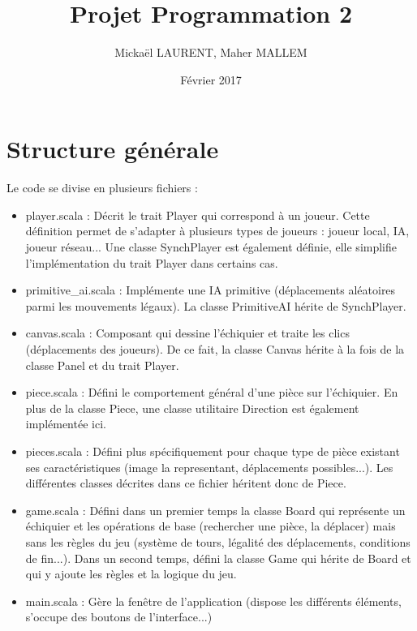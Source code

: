 \documentclass[11pt]{article}
\title{Projet Programmation 2}
\author{Mickaël LAURENT, Maher MALLEM}
\date{Février 2017}
\begin{document}
\renewcommand{\labelitemi}{-}
\maketitle

\section{Structure générale}

Le code se divise en plusieurs fichiers :\newline
\begin{itemize}
\item player.scala : Décrit le trait Player qui correspond à un joueur. Cette définition permet de s'adapter à plusieurs types de joueurs : joueur local, IA, joueur réseau... Une classe SynchPlayer est également définie, elle simplifie l'implémentation du trait Player dans certains cas.\newline

\item primitive\_ai.scala : Implémente une IA primitive (déplacements aléatoires parmi les mouvements légaux). La classe PrimitiveAI hérite de SynchPlayer.\newline

\item canvas.scala : Composant qui dessine l'échiquier et traite les clics (déplacements des joueurs). De ce fait, la classe Canvas hérite à la fois de la classe Panel et du trait Player.\newline

\item piece.scala : Défini le comportement général d'une pièce sur l'échiquier. En plus de la classe Piece, une classe utilitaire Direction est également implémentée ici.\newline

\item pieces.scala : Défini plus spécifiquement pour chaque type de pièce existant ses caractéristiques (image la representant, déplacements possibles...). Les différentes classes décrites dans ce fichier héritent donc de Piece.\newline

\item game.scala : Défini dans un premier temps la classe Board qui représente un échiquier et les opérations de base (rechercher une pièce, la déplacer) mais sans les règles du jeu (système de tours, légalité des déplacements, conditions de fin...). Dans un second temps, défini la classe Game qui hérite de Board et qui y ajoute les règles et la logique du jeu.\newline

\item main.scala : Gère la fenêtre de l'application (dispose les différents éléments, s'occupe des boutons de l'interface...)
\end{itemize}
\-
\end{document}
